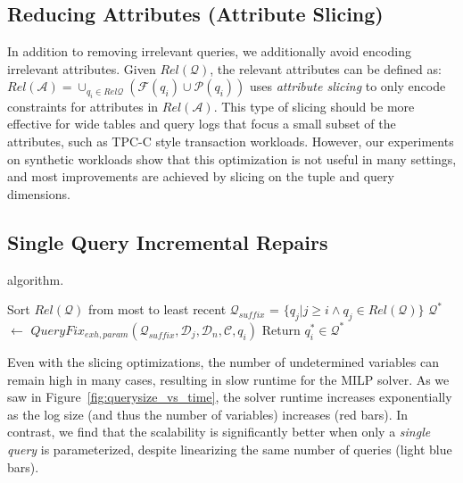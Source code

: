 \subsection{Reducing Attributes (Attribute Slicing)}

In addition to removing irrelevant queries, we additionally avoid encoding irrelevant attributes.
Given $Rel\mathcal{(Q)}$, the relevant attributes can be defined as:
$Rel\mathcal{(A)} = \cup_{q_i \in Rel\mathcal{Q}} (\mathcal{F}(q_i)\cup \mathcal{P}(q_i))$
\aslice uses \emph{attribute slicing} to only encode constraints for attributes in $Rel\mathcal{(A)}$.
This type of slicing should be more effective for wide tables and query logs that focus a small subset of the attributes, such as TPC-C style transaction workloads. 
However, our experiments on synthetic workloads show that this optimization is not useful in many settings, and most improvements are achieved by slicing on the tuple and query dimensions.




\subsection{Single Query Incremental Repairs}\label{sec:incremental}

\begin{algorithm}[t]
\caption{\incremental algorithm. 
}
\scriptsize
\label{alg:incalg}
\begin{algorithmic}[2]
\STATE Sort $Rel\mathcal{(Q)}$ from most to least recent
  \STATE $\mathcal{Q}_{suffix}$ = $\{q_j | j \ge i \wedge q_j \in Rel\mathcal{(Q)}\}$
  \STATE $\mathcal{Q}^*$ $\leftarrow$ $QueryFix_{exh,param}(\mathcal{Q}_{suffix}, \mathcal{D}_j, \mathcal{D}_n, \mathcal{C}, q_i)$
    \STATE Return $q_i^* \in \mathcal{Q}^*$
  \ENDIF
\ENDFOR
\end{algorithmic}
\end{algorithm}

Even with the slicing optimizations, the number of undetermined variables can remain high in many cases, resulting in slow runtime for the MILP solver.  As we saw in
Figure~\ref{fig:querysize_vs_time}, the solver runtime increases exponentially
as the log size (and thus the number of variables) increases (red bars).
In contrast, we find that the scalability is significantly better when only a \emph{single query}
is parameterized, despite linearizing the same number of queries (light blue bars).

